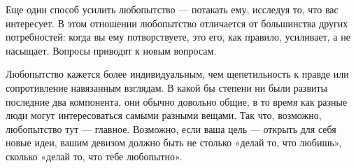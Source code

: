 \documentclass[ebook,12pt,oneside,openany]{memoir}
\begin{document}
Еще один способ усилить любопытство — потакать ему, исследуя то, что
вас интересует. В этом отношении любопытство отличается от большинства
других потребностей: когда вы ему потворствуете, это его, как правило,
усиливает, а не насыщает. Вопросы приводят к новым вопросам.

Любопытство кажется более индивидуальным, чем щепетильность к правде
или сопротивление навязанным взглядам. В какой бы степени ни были
развиты последние два компонента, они обычно довольно общие, в то
время как разные люди могут интересоваться самыми разными вещами. Так
что, возможно, любопытство тут — главное. Возможно, если ваша цель —
открыть для себя новые идеи, вашим девизом должно быть не столько
«делай то, что любишь», сколько «делай то, что тебе любопытно».
\end{document}

